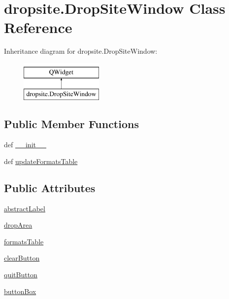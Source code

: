 \hypertarget{classdropsite_1_1DropSiteWindow}{}\section{dropsite.\+Drop\+Site\+Window Class Reference}
\label{classdropsite_1_1DropSiteWindow}
Inheritance diagram for dropsite.\+Drop\+Site\+Window\+:\begin{figure}[H]
\begin{center}
\leavevmode
\includegraphics[height=2.000000cm]{classdropsite_1_1DropSiteWindow}
\end{center}
\end{figure}
\subsection*{Public Member Functions}
\begin{DoxyCompactItemize}
\item 
def \hyperlink{classdropsite_1_1DropSiteWindow_adc965cd6056aa275a88e8c8ed8378566}{\+\_\+\+\_\+init\+\_\+\+\_\+}
\item 
def \hyperlink{classdropsite_1_1DropSiteWindow_a7f91c31b2ff2ea4bc3b4a60b5a5f0cb8}{update\+Formats\+Table}
\end{DoxyCompactItemize}
\subsection*{Public Attributes}
\begin{DoxyCompactItemize}
\item 
\hyperlink{classdropsite_1_1DropSiteWindow_a9d015881b6c8bbbfede5ade6fdfed4ec}{abstract\+Label}
\item 
\hyperlink{classdropsite_1_1DropSiteWindow_a356052e54241919d003c34dbf5239332}{drop\+Area}
\item 
\hyperlink{classdropsite_1_1DropSiteWindow_a9631899a7fac8b371054486aa1d5401f}{formats\+Table}
\item 
\hyperlink{classdropsite_1_1DropSiteWindow_a8eb0f932a172f74f9dc8f13161981a83}{clear\+Button}
\item 
\hyperlink{classdropsite_1_1DropSiteWindow_a1494754da378ffc5cfbb8354a64c67b9}{quit\+Button}
\item 
\hyperlink{classdropsite_1_1DropSiteWindow_ad4e26b73a0b4996a7ea71fa097b4e9cd}{button\+Box}
\end{DoxyCompactItemize}


